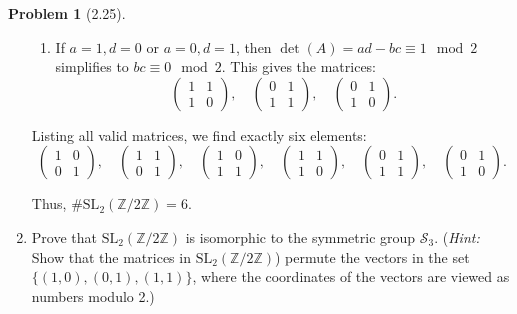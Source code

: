 \documentclass[12pt]{article}
\theoremstyle{definition}
\newtheorem{problem}{Problem}
\begin{document}
\begin{problem}[2.25]
\begin{enumerate}[label=(\alph*)]
\begin{solution}
\begin{enumerate}[label=(\roman*)]
            \item If $a = 1, d = 0$ or $a = 0, d = 1$, then $\det(A) = ad - bc \equiv 1 \mod 2$ simplifies to $bc \equiv 0 \mod 2$. This gives the matrices:
              \[
              \begin{pmatrix} 1 & 1 \\ 1 & 0 \end{pmatrix}, \quad
              \begin{pmatrix} 0 & 1 \\ 1 & 1 \end{pmatrix}, \quad
              \begin{pmatrix} 0 & 1 \\ 1 & 0 \end{pmatrix}.
              \]
            \end{enumerate}
    
            Listing all valid matrices, we find exactly six elements:
            \[
            \begin{pmatrix} 1 & 0 \\ 0 & 1 \end{pmatrix}, \quad
            \begin{pmatrix} 1 & 1 \\ 0 & 1 \end{pmatrix}, \quad
            \begin{pmatrix} 1 & 0 \\ 1 & 1 \end{pmatrix}, \quad
            \begin{pmatrix} 1 & 1 \\ 1 & 0 \end{pmatrix}, \quad
            \begin{pmatrix} 0 & 1 \\ 1 & 1 \end{pmatrix}, \quad
            \begin{pmatrix} 0 & 1 \\ 1 & 0 \end{pmatrix}.
            \]
    
            Thus, $\#\text{SL}_2(\mathbb{Z}/2\mathbb{Z}) = 6$.
            
        \end{solution}
        \item Prove that $\text{SL}_2(\mathbb{Z}/2\mathbb{Z})$ is isomorphic to the symmetric group $\mathcal{S}_3$. (\textit{Hint:} Show that the matrices in $\text{SL}_2(\mathbb{Z}/2\mathbb{Z})$) permute
              the vectors in the set $\{(1, 0), (0, 1), (1, 1)\}$, where the coordinates of the vectors are viewed as numbers modulo 2.)
        

\end{enumerate}
\end{problem}
\end{document}
